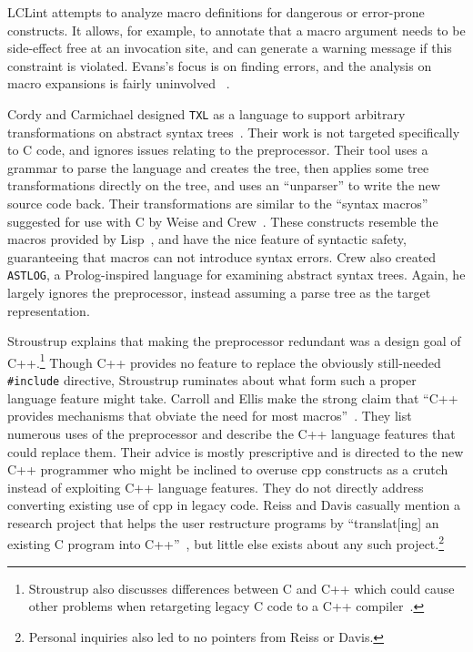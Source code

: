 \documentclass{article}
\newcommand{\Cpp}{\mbox{\textsf{cpp}}}
\newcommand{\CPP}{\mbox{\textsf{C++}}}
\newcommand{\C}{\mbox{\textsf{C}}}
\newcommand{\ppd}[1]{\texttt{\##1}}
\begin{document}
LCLint attempts to analyze macro definitions for
dangerous or error-prone constructs.  It allows, for example, to
annotate that a macro argument needs to be side-effect free at an
invocation site, and can generate a warning message if this constraint
is violated.  Evans's focus is on finding errors, and the
analysis on macro expansions is fairly uninvolved
~\cite[Ch.~8]{LCLint}.

Cordy and Carmichael designed \texttt{TXL} as a language to support
arbitrary transformations on abstract syntax trees~\cite{TXL}.  Their
work is not targeted specifically to \C{} code, and ignores issues
relating to the preprocessor.  Their tool uses a grammar to parse the
language and creates the tree, then applies some tree transformations
directly on the tree, and uses an ``unparser'' to write the new source
code back.  Their transformations are similar to the ``syntax macros''
suggested for use with \C{} by Weise and Crew~\cite{Weise93}.  These
constructs resemble the macros provided by Lisp~\cite{Steele90}, and
have the nice feature of syntactic safety, guaranteeing that macros can
not introduce syntax errors. Crew also created \texttt{ASTLOG}, a
\textsf{Prolog}-inspired language for examining abstract syntax trees.
Again, he largely ignores the preprocessor, instead assuming a parse
tree as the target representation.

Stroustrup explains that making the preprocessor redundant was a design
goal of \CPP{}.\footnote{Stroustrup also discusses differences between
  \C{} and \CPP{} which could cause other problems when retargeting
  legacy \C{} code to a \CPP{}
  compiler~\cite[p.~816-820]{Stroustrup97}.} Though \CPP{} provides no
feature to replace the obviously still-needed \ppd{include} directive,
Stroustrup ruminates about what form such a proper language feature
might take.  Carroll and Ellis make the strong claim that ``C++ provides
mechanisms that obviate the need for most
macros''~\cite[p.~147]{Carroll95}.  They list numerous uses of the
preprocessor and describe the \CPP{} language features that could
replace them.  Their advice is mostly prescriptive and is directed to
the new \CPP{} programmer who might be inclined to overuse \Cpp{}
constructs as a crutch instead of exploiting \CPP{} language features.
They do not directly address converting existing use of \Cpp{} in legacy
code.  Reiss and Davis casually mention a research project that helps
the user restructure programs by ``translat[ing] an existing \C{}
program into \CPP{}''~\cite[p.~2]{Reiss90}, but little else exists about
any such project.\footnote{Personal inquiries also led to no pointers
  from Reiss or Davis.}
\end{document}
